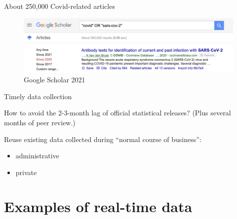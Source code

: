 \documentclass[ignorenonframetext,aspectratio=54,]{beamer}
\providecommand{\tightlist}{%
  \setlength{\itemsep}{0pt}\setlength{\parskip}{0pt}}
\begin{document}
\begin{frame}{About 250,000 Covid-related articles}
\protect\hypertarget{about-250000-covid-related-articles}{}

\begin{figure}
\centering
\includegraphics{exhibit/fig/google-scholar.png}
\caption{Google Scholar 2021}
\end{figure}

\end{frame}

\begin{frame}{Timely data collection}
\protect\hypertarget{timely-data-collection}{}

How to avoid the 2-3-month lag of official statistical releases? (Plus
several months of peer review.)

Reuse existing data collected during ``normal course of business'':

\begin{itemize}
\tightlist
\item
  administrative
\item
  private
\end{itemize}

\end{frame}

\hypertarget{examples-of-real-time-data}{%
\section{Examples of real-time data}\label{examples-of-real-time-data}}
\end{document}
